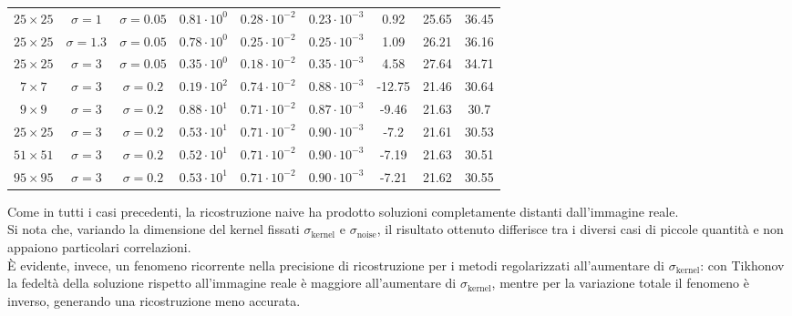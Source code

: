\documentclass[11pt]{article}
\begin{document}
\begin{center}
\begin{tabular}{ |cc|c|c|c|c|c|c|c| }
    $25 \times 25$ & $\sigma=1$ & $\sigma=0.05$ & $0.81 \cdot 10^{0}$ & $0.28 \cdot 10^{-2}$ & $0.23 \cdot 10^{-3}$ & 0.92 & 25.65 & 36.45 \\
    $25 \times 25$ & $\sigma=1.3$ & $\sigma=0.05$ & $0.78 \cdot 10^{0}$ & $0.25 \cdot 10^{-2}$ & $0.25 \cdot 10^{-3}$ & 1.09 & 26.21 & 36.16 \\
    $25 \times 25$ & $\sigma=3$ & $\sigma=0.05$ & $0.35 \cdot 10^{0}$ & $0.18 \cdot 10^{-2}$ & $0.35 \cdot 10^{-3}$ & 4.58 & 27.64 & 34.71 \\
    \hline
	$7 \times 7$ & $\sigma=3$ & $\sigma=0.2$ & $0.19 \cdot 10^{2}$ & $0.74 \cdot 10^{-2}$ & $0.88 \cdot 10^{-3}$ & -12.75 & 21.46 & 30.64 \\
	$9 \times 9$ & $\sigma=3$ & $\sigma=0.2$ & $0.88 \cdot 10^{1}$ & $0.71 \cdot 10^{-2}$ & $0.87 \cdot 10^{-3}$ & -9.46 & 21.63 & 30.7 \\
	$25 \times 25$ & $\sigma=3$ & $\sigma=0.2$ & $0.53 \cdot 10^{1}$ & $0.71 \cdot 10^{-2}$ & $0.90 \cdot 10^{-3}$ & -7.2 & 21.61 & 30.53 \\
	$51 \times 51$ & $\sigma=3$ & $\sigma=0.2$ & $0.52 \cdot 10^{1}$ & $0.71 \cdot 10^{-2}$ & $0.90 \cdot 10^{-3}$ & -7.19 & 21.63 & 30.51 \\
	$95 \times 95$ & $\sigma=3$ & $\sigma=0.2$ & $0.53 \cdot 10^{1}$ & $0.71 \cdot 10^{-2}$ & $0.90 \cdot 10^{-3}$ & -7.21 & 21.62 & 30.55 \\
    \hline
    \end{tabular}
\end{center}
Come in tutti i casi precedenti, la ricostruzione naive ha prodotto soluzioni completamente distanti dall'immagine reale.\\
Si nota che, variando la dimensione del kernel fissati $\sigma_{\text{kernel}}$ e $\sigma_{\text{noise}}$, il risultato ottenuto differisce tra i diversi casi di piccole quantità e non appaiono particolari correlazioni.\\
È evidente, invece, un fenomeno ricorrente nella precisione di ricostruzione per i metodi regolarizzati all'aumentare di $\sigma_{\text{kernel}}$: con Tikhonov la fedeltà della soluzione rispetto all'immagine reale è maggiore all'aumentare di $\sigma_{\text{kernel}}$, mentre per la variazione totale il fenomeno è inverso, generando una ricostruzione meno accurata.
\end{document}
